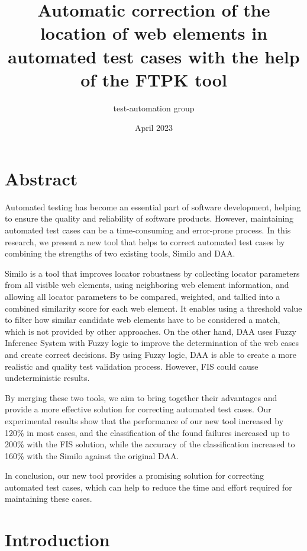 \documentclass{article}
\title{Automatic correction of the location of web elements in automated test cases with the help of the FTPK tool}
\author{test-automation group}
\date{April 2023}
\begin{document}
\maketitle

\section{Abstract}

Automated testing has become an essential part of software development, helping to ensure the quality and reliability of software products. However, maintaining automated test cases can be a time-consuming and error-prone process. In this research, we present a new tool that helps to correct automated test cases by combining the strengths of two existing tools, Similo and DAA.

Similo is a tool that improves locator robustness by collecting locator parameters from all visible web elements, using neighboring web element information, and allowing all locator parameters to be compared, weighted, and tallied into a combined similarity score for each web element. It enables using a threshold value to filter how similar candidate web elements have to be considered a match, which is not provided by other approaches. On the other hand, DAA uses Fuzzy Inference System with Fuzzy logic to improve the determination of the web cases and create correct decisions. By using Fuzzy logic, DAA is able to create a more realistic and quality test validation process. However, FIS could cause undeterministic results.

By merging these two tools, we aim to bring together their advantages and provide a more effective solution for correcting automated test cases. Our experimental results show that the performance of our new tool increased by 120\% in most cases, and the classification of the found failures increased up to 200\% with the FIS solution, while the accuracy of the classification increased to 160\% with the Similo against the original DAA.

In conclusion, our new tool provides a promising solution for correcting automated test cases, which can help to reduce the time and effort required for maintaining these cases.

\maketitle

\section{Introduction}
\end{document}
